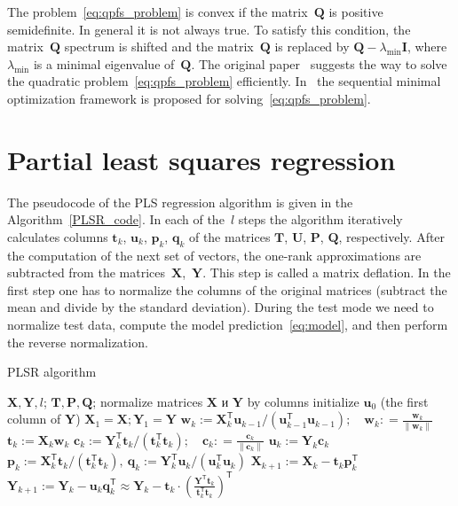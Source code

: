 \documentclass[12pt,oneside]{article}
\theoremstyle{definition}
\newcommand{\bw}{\mathbf{w}}
\newcommand{\bY}{\mathbf{Y}}
\newcommand{\bX}{\mathbf{X}}
\newcommand{\bu}{\mathbf{u}}
\newcommand{\bt}{\mathbf{t}}
\newcommand{\bp}{\mathbf{p}}
\newcommand{\bq}{\mathbf{q}}
\newcommand{\bc}{\mathbf{c}}
\newcommand{\bP}{\mathbf{P}}
\newcommand{\bT}{\mathbf{T}}
\newcommand{\bQ}{\mathbf{Q}}
\newcommand{\bU}{\mathbf{U}}
\newcommand{\T}{\mathsf{T}}
\begin{document}
The problem~\eqref{eq:qpfs_problem} is convex if the matrix~$\bQ$ is positive semidefinite. In general it is not always true.
To satisfy this condition, the matrix~$\bQ$ spectrum is shifted and the matrix~$\bQ$ is replaced by $\bQ - \lambda_{\text{min}} \mathbf{I}$, where $\lambda_{\text{min}} $ is a minimal eigenvalue of~$\bQ$.
The original paper~\cite{rodriguez2010quadratic} suggests the way to solve the quadratic problem~\eqref{eq:qpfs_problem} efficiently. In~\cite{prasad2013scaling} the sequential minimal optimization framework is proposed for solving~\eqref{eq:qpfs_problem}.

\section{Partial least squares regression}
\label{sec:pls}

The pseudocode of the PLS regression algorithm is given in the Algorithm~\ref{PLSR_code}.
In each of the~$l$ steps the algorithm iteratively calculates columns $\bt_k$, $\bu_k$, $\bp_k$, $\bq_k$ of the matrices $\bT$, $\bU$, $\bP$, $\bQ$, respectively. 
After the computation of the next set of vectors, the one-rank approximations are subtracted from the matrices~$\bX$,~$\bY$. 
This step is called a matrix deflation.
In the first step one has to normalize the columns of the original matrices (subtract the mean and divide by the standard deviation).
During the test mode we need to normalize test data, compute the model prediction~\eqref{eq:model}, and then perform the reverse normalization.

\begin{algorithm}[h]
	\caption{PLSR algorithm}
	\label{PLSR_code}
	\begin{algorithmic}[1]
		\REQUIRE $\bX, \bY, l$;
		\ENSURE $\bT, \bP, \bQ$;
		\STATE normalize matrices $\bX$ и $\bY$ by columns
		\STATE initialize $\bu_0$ (the first column of $\bY$)
		\STATE $\bX_1 = \bX; \bY_1 = \bY$
		\REPEAT
		\vspace{0.1cm}
		\STATE $\bw_k := \bX_k^{\T} \bu_{k-1} / (\bu_{k-1}^{\T} \bu_{k-1}); \quad \bw_k: = \frac{\bw_k}{\| \bw_k \|}$
		\vspace{0.1cm}
		\STATE $\bt_k := \bX_k \bw_k$
		\vspace{0.1cm}
		\STATE $\bc_k := \bY_k^{\T} \bt_k / (\bt_k^{\T} \bt_k); \quad \bc_k: = \frac{\bc_k}{\| \bc_k \|}$
		\vspace{0.1cm}
		\STATE $\bu_k := \bY_k \bc_k$
		\UNTIL{$\bt_k$ stabilizes}
		\vspace{0.1cm}
		\STATE $\bp_k:= \bX_k^{\T}\bt_k/(\bt_k^{\T}\bt_k),\ 
		\bq_k := \bY_k^{\T}\bu_k/(\bu_k^{\T}\bu_k)$
		\vspace{0.2cm}
		\STATE $\bX_{k+1} :=  \bX_k - \bt_k \bp_k^{\T}$
		\vspace{0.2cm}
		\STATE $\bY_{k + 1} :=  \bY_k - \bu_k \bq_k^{\T} \approx  \bY_k - \bt_k \cdot \left(\frac{\bY^{\T}\bt_k}{\bt_k^{\T}\bt_k}\right)^{\T} $ 
		\ENDFOR
	\end{algorithmic}
\end{algorithm}
\end{document}
